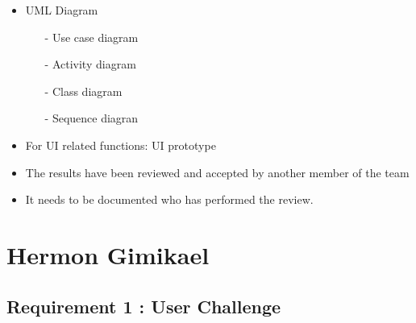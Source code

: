 \documentclass{article}
\begin{document}
\begin{itemize}
\item
  UML Diagram
  \begin{itemize}
	\item[-] Use case diagram
	\item[-] Activity diagram
	\item[-] Class diagram
	\item[-] Sequence diagran
   \end{itemize}
\end{itemize}

\begin{itemize}
\item
  For UI related functions: UI prototype
\item
  The results have been reviewed and accepted by another member of the
  team
\end{itemize}

\begin{itemize}
\item
  It needs to be documented who has performed the review.
\end{itemize}
\newpage

\section{Hermon Gimikael}
\subsection{Requirement 1 : User Challenge}
\end{document}
